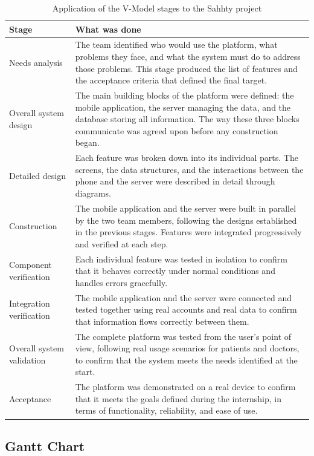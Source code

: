\begin{table}[H]
\centering
\caption{Application of the V-Model stages to the Sahhty project}
\renewcommand{\arraystretch}{1.45}
\begin{tabular}{|p{4.5cm}|p{8.5cm}|}
\hline
\textbf{Stage} & \textbf{What was done} \\
\hline
Needs analysis &
The team identified who would use the platform, what problems they face, and what the
system must do to address those problems. This stage produced the list of features and
the acceptance criteria that defined the final target. \\
\hline
Overall system design &
The main building blocks of the platform were defined: the mobile application, the
server managing the data, and the database storing all information. The way these three
blocks communicate was agreed upon before any construction began. \\
\hline
Detailed design &
Each feature was broken down into its individual parts. The screens, the data structures,
and the interactions between the phone and the server were described in detail through
diagrams. \\
\hline
Construction &
The mobile application and the server were built in parallel by the two team members,
following the designs established in the previous stages. Features were integrated
progressively and verified at each step. \\
\hline
Component verification &
Each individual feature was tested in isolation to confirm that it behaves correctly
under normal conditions and handles errors gracefully. \\
\hline
Integration verification &
The mobile application and the server were connected and tested together using real
accounts and real data to confirm that information flows correctly between them. \\
\hline
Overall system validation &
The complete platform was tested from the user's point of view, following real usage
scenarios for patients and doctors, to confirm that the system meets the needs
identified at the start. \\
\hline
Acceptance &
The platform was demonstrated on a real device to confirm that it meets the goals
defined during the internship, in terms of functionality, reliability, and ease of use. \\
\hline
\end{tabular}
\end{table}

\subsection{Gantt Chart}

